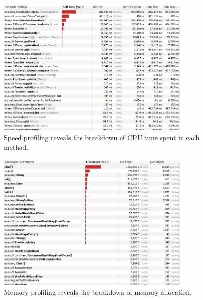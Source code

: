 \documentclass[a4paper, 11pt, titlepage]{report}
\begin{document}
\begin{appendices}
\begin{figure}[H]
	\centering
	\includegraphics[width=0.85\textwidth]{figures/Speed-profiling.png}
	\caption{Speed profiling reveals the breakdown of CPU time spent in each method.}
	\label{fig:speed-profiling}
\end{figure}

\begin{figure}[H]
	\centering
	\includegraphics[width=0.85\textwidth]{figures/Memory-profiling.png}
	\caption{Memory profiling reveals the breakdown of memory allocation.}
	\label{fig:memory-profiling}
\end{figure}

\end{appendices}

\renewcommand{\bibname}{References}

  
\end{document}
